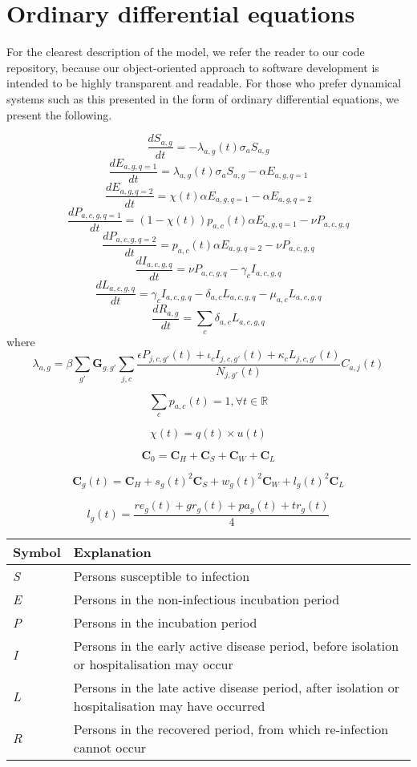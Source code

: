 
\section{Ordinary differential equations}

For the clearest description of the model, we refer the reader to our code repository, because our object-oriented approach to software development is intended to be highly transparent and readable. For those who prefer dynamical systems such as this presented in the form of ordinary differential equations, we present the following.

\[\frac{dS_{a,g}}{dt}=-\lambda_{a,g}(t) \sigma_{a} S_{a,g}\]
\[\frac{dE_{a,g,q=1}}{dt}=\lambda_{a,g}(t) \sigma_{a} S_{a,g}- \alpha E_{a,g,q=1} \]
\[\frac{dE_{a,g,q=2}}{dt}=\chi(t) \alpha E_{a,g,q=1} -\alpha E_{a,g,q=2}\]
\[\frac{dP_{a,c,g,q=1}}{dt}=(1 - \chi(t)) p_{a,c}(t) \alpha E_{a,g,q=1}-\nu P_{a,c,g,q}\]
\[\frac{dP_{a,c,g,q=2}}{dt}=p_{a,c}(t) \alpha E_{a,g,q=2}-\nu P_{a,c,g,q}\]
\[\frac{dI_{a,c,g,q}}{dt}=\nu P_{a,c,g,q}-\gamma_{c}I_{a,c,g,q}\]
\[\frac{dL_{a,c,g,q}}{dt}=\gamma_{c}I_{a,c,g,q}-\delta_{a,c}L_{a,c,g,q}-\mu_{a,c}L_{a,c,g,q}\]
\[\frac{dR_{a,g}}{dt}=\sum_{c}{}\delta_{a,c}L_{a,c,g,q}\]
where
\[\lambda_{a,g}=\beta \sum_{g'}\textbf{G}_{g,g'} \sum_{j,c}\frac{\epsilon P_{j,c,g'}(t)+\iota_{c}I_{j,c,g'}(t)+\kappa_{c}L_{j,c,g'}(t)}{N_{j,g'}(t)} C_{a,j}(t)\]

\[\sum_{c}p_{a,c}(t)=1,\forall t\in\mathbb{R}\]

\[\chi(t) = q(t) \times u(t)\]

\[\textbf{C}_{0}=\textbf{C}_{H}+\textbf{C}_{S}+\textbf{C}_{W}+\textbf{C}_{L}\]

\[\textbf{C}_{g}(t)=\textbf{C}_{H}+s_{g}(t)^{2}\textbf{C}_{S}+w_{g}(t)^{2}\textbf{C}_{W}+l_{g}(t)^{2}\textbf{C}_{L}\]

\[l_{g}(t)=\frac{re_{g}(t)+gr_{g}(t)+pa_{g}(t)+tr_{g}(t)}{4}\]

\begin{table}[ht]
\renewcommand{\baselinestretch}{1}
    	\begin{tabular}{| p{2cm} | p{11.1cm} |}
    	\hline
    		Symbol & Explanation \\
	    	\hline
	    	\textit{S} & Persons susceptible to infection \\
    		\textit{E} & Persons in the non-infectious incubation period \\
    		\textit{P} & Persons in the incubation period \\
    		\textit{I} & Persons in the early active disease period, before isolation or hospitalisation may occur \\
    		\textit{L} & Persons in the late active disease period, after isolation or hospitalisation may have occurred \\
    		\textit{R} & Persons in the recovered period, from which re-infection cannot occur \\
    		\hline
	\end{tabular}
\end{table}



